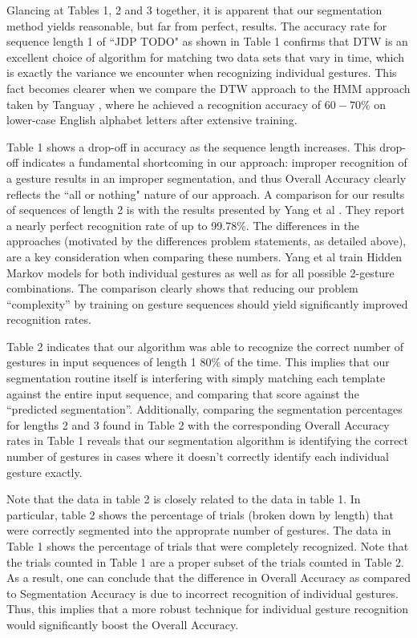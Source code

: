 \documentclass[twoside]{article}
\begin{document}
\begin{multicols}{2}
Glancing at Tables 1, 2 and 3 together, it is apparent that our segmentation
method yields reasonable, but far from perfect, results. The accuracy rate for
sequence length 1 of ``JDP TODO" as shown in Table 1 confirms that DTW is an
excellent choice of algorithm for matching two data sets that vary in time,
which is exactly the variance we encounter when recognizing individual gestures.
This fact becomes clearer when we compare the DTW approach to the HMM approach taken by Tanguay \cite{tanguay_jr_hidden_1995}, where he
achieved a recognition accuracy of
$60-70\%$ on lower-case English alphabet letters after extensive training.

Table 1 shows a drop-off in accuracy as the sequence length increases. This
drop-off indicates a fundamental shortcoming in our approach: improper
recognition of a gesture results in an improper segmentation, and thus Overall
Accuracy clearly reflects the ``all or nothing" nature of our approach. A
comparison for our results of sequences of length 2 is with the results presented by Yang et
al \cite{yang_gesture_1994}. They report a nearly perfect recognition rate of up to 99.78\%.
The differences in the approaches (motivated by the differences problem statements, as detailed above), are a key consideration when comparing these numbers.
Yang et al train Hidden Markov models for both individual gestures as well as
for all possible 2-gesture combinations. The comparison clearly shows that reducing our problem ``complexity'' by training on gesture sequences should yield significantly improved recognition rates.

Table 2 indicates that our algorithm was able to recognize the correct number of
gestures in input sequences of length 1 80\% of the time.
This implies that our segmentation routine itself is interfering with simply
matching each template against the entire input sequence, and comparing that
score against the ``predicted segmentation''.
Additionally, comparing the segmentation percentages for lengths 2 and 3 found
in Table 2 with the corresponding Overall Accuracy rates in Table 1 reveals that
our segmentation algorithm is identifying the correct number of gestures in
cases where it doesn't correctly identify each individual gesture exactly.

Note that the data in table 2 is closely related to the data in table 1. In
particular, table 2 shows the percentage of trials (broken down by length) that
were correctly segmented into the approprate number of gestures. The data in
Table 1 shows the percentage of trials that were completely recognized. Note
that the trials counted in Table 1 are a proper subset of the trials counted in
Table 2. As a result, one can conclude that the difference in Overall Accuracy
as compared to Segmentation Accuracy is due to incorrect recognition of
individual gestures. Thus, this implies that a more robust technique for
individual gesture recognition would significantly boost the Overall Accuracy.


\end{multicols}
\end{document}
